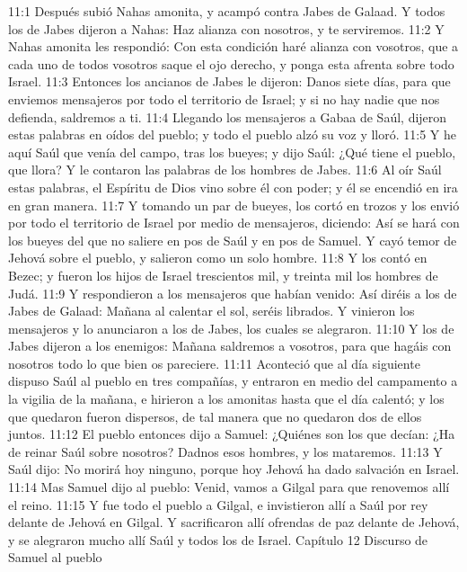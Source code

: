 11:1 Después subió Nahas amonita, y acampó contra Jabes de Galaad. Y todos los de Jabes dijeron a Nahas: Haz alianza con nosotros, y te serviremos.  
11:2 Y Nahas amonita les respondió: Con esta condición haré alianza con vosotros, que a cada uno de todos vosotros saque el ojo derecho, y ponga esta afrenta sobre todo Israel.  
11:3 Entonces los ancianos de Jabes le dijeron: Danos siete días, para que enviemos mensajeros por todo el territorio de Israel; y si no hay nadie que nos defienda, saldremos a ti.  
11:4 Llegando los mensajeros a Gabaa de Saúl, dijeron estas palabras en oídos del pueblo; y todo el pueblo alzó su voz y lloró.  
11:5 Y he aquí Saúl que venía del campo, tras los bueyes; y dijo Saúl: ¿Qué tiene el pueblo, que llora? Y le contaron las palabras de los hombres de Jabes.  
11:6 Al oír Saúl estas palabras, el Espíritu de Dios vino sobre él con poder; y él se encendió en ira en gran manera.  
11:7 Y tomando un par de bueyes, los cortó en trozos y los envió por todo el territorio de Israel por medio de mensajeros, diciendo: Así se hará con los bueyes del que no saliere en pos de Saúl y en pos de Samuel. Y cayó temor de Jehová sobre el pueblo, y salieron como un solo hombre.  
11:8 Y los contó en Bezec; y fueron los hijos de Israel trescientos mil, y treinta mil los hombres de Judá.  
11:9 Y respondieron a los mensajeros que habían venido: Así diréis a los de Jabes de Galaad: Mañana al calentar el sol, seréis librados. Y vinieron los mensajeros y lo anunciaron a los de Jabes, los cuales se alegraron.  
11:10 Y los de Jabes dijeron a los enemigos: Mañana saldremos a vosotros, para que hagáis con nosotros todo lo que bien os pareciere.  
11:11 Aconteció que al día siguiente dispuso Saúl al pueblo en tres compañías, y entraron en medio del campamento a la vigilia de la mañana, e hirieron a los amonitas hasta que el día calentó; y los que quedaron fueron dispersos, de tal manera que no quedaron dos de ellos juntos.  
11:12 El pueblo entonces dijo a Samuel: ¿Quiénes son los que decían: ¿Ha de reinar Saúl sobre nosotros? Dadnos esos hombres, y los mataremos.  
11:13 Y Saúl dijo: No morirá hoy ninguno, porque hoy Jehová ha dado salvación en Israel.  
11:14 Mas Samuel dijo al pueblo: Venid, vamos a Gilgal para que renovemos allí el reino.  
11:15 Y fue todo el pueblo a Gilgal, e invistieron allí a Saúl por rey delante de Jehová en Gilgal. Y sacrificaron allí ofrendas de paz delante de Jehová, y se alegraron mucho allí Saúl y todos los de Israel.  
Capítulo 12 
Discurso de Samuel al pueblo  


